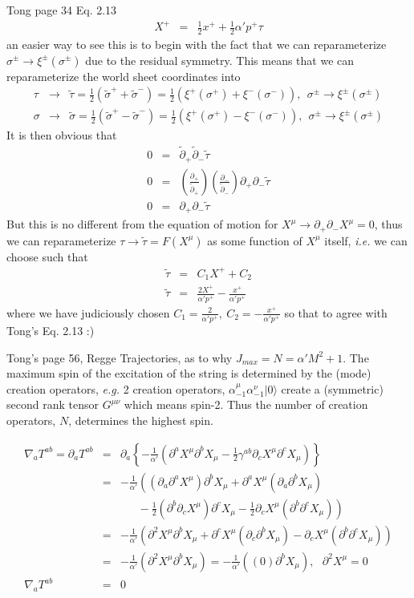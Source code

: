 \documentclass[aps,preprint,preprintnumbers,nofootinbib,showpacs,prd]{revtex4-1}
\newcommand{\ie}{{\it i.e.} }
\newcommand{\eg}{{\it e.g.} }
\newcommand{\nbea}{\begin{eqnarray*}}
\newcommand{\neea}{\end{eqnarray*}}
\begin{document}
Tong page 34 Eq. 2.13
%
\nbea
X^+ & = & \frac{1}{2} x^+ + \frac{1}{2} \alpha' p^+ \tau
\neea
%
an easier way to see this is to begin with the fact that we can reparameterize $\sigma^\pm \rightarrow \xi^\pm(\sigma^\pm)$ due to the residual symmetry. This means that we can reparameterize the world sheet coordinates into
%
\nbea
\tau & \rightarrow & \tilde \tau = \frac{1}{2} (\tilde \sigma^+ + \tilde \sigma^-) = \frac{1}{2} (\xi^+(\sigma^+) + \xi^-(\sigma^-)), ~~\sigma^\pm \rightarrow \xi^\pm(\sigma^\pm) \\
\sigma & \rightarrow & \tilde \sigma = \frac{1}{2} (\tilde \sigma^+ - \tilde \sigma^-) = \frac{1}{2} (\xi^+(\sigma^+) - \xi^-(\sigma^-)), ~~\sigma^\pm \rightarrow \xi^\pm(\sigma^\pm)
\neea
%
It is then obvious that
%
\nbea
0 & = & \tilde \partial_+\tilde \partial_- \tilde\tau \\
0 & = & \left ( \frac {\partial_+}{\tilde \partial_+} \right ) \left ( \frac {\partial_-}{\tilde \partial_-} \right ) \partial_+ \partial_- \tilde\tau \\
0 & = & \partial_+ \partial_- \tilde\tau 
\neea
%
But this is no different from the equation of motion for $X^\mu \rightarrow \partial_+\partial_-X^\mu = 0$, thus we can reparameterize $\tau \rightarrow \tilde \tau = F(X^\mu)$ as some function of $X^\mu$ itself, \ie we can choose such that
%
\nbea
\tilde \tau & = & C_1 X^+ + C_2 \\
\tilde\tau & = & \frac{2 X^+}{\alpha' p^+} - \frac{x^+}{\alpha'p^+}
\neea
%
where we have judiciously chosen $C_1 = \frac{2}{\alpha' p^+},~C_2 = - \frac{x^+}{\alpha'p^+}$ so that to agree with Tong's Eq. 2.13 :)

Tong's page 56, Regge Trajectories, as to why $J_{max} = N = \alpha' M^2 + 1$. The maximum spin of the excitation of the string is determined by the (mode) creation operators, \eg 2 creation operators, $\alpha_{-1}^\mu \alpha_{-1}^\nu |0\rangle$ create a (symmetric) second rank tensor $G^{\mu\nu}$ which means spin-2. Thus the number of creation operators, $N$, determines the highest spin.


%
\nbea
\nabla_a T^{ab} = \partial_a T^{ab} & = & \partial_a \left \{ -\frac{1}{\alpha'} \left ( \partial^a X^\mu \partial^b X_\mu - \frac{1}{2} \gamma^{ab} \partial_c X^\mu \partial^c X_\mu \right ) \right \} \\
& = & -\frac{1}{\alpha'} \left ( (\partial_a \partial^a X^\mu) \partial^b X_\mu + \partial^a X^\mu (\partial_a\partial^b X_\mu) \frac{}{} \right. \\
& & \left . ~~~~~~~ - \frac{1}{2} (\partial^b \partial_c X^\mu) \partial^c X_\mu - \frac{1}{2} \partial_c X^\mu (\partial^b \partial^c X_\mu) \right ) \\
& = & -\frac{1}{\alpha'} \left ( \partial^2 X^\mu \partial^b X_\mu + \partial^c X^\mu (\partial_c\partial^b X_\mu) - \partial_c X^\mu (\partial^b \partial^c X_\mu) \right ) \\
& = & -\frac{1}{\alpha'} \left ( \partial^2 X^\mu \partial^b X_\mu \right ) = -\frac{1}{\alpha'} \left ( (0) \partial^b X_\mu \right ), ~~~ \partial^2 X^\mu = 0 \\
\nabla_a T^{ab} & = & 0
\neea
%
\end{document}
